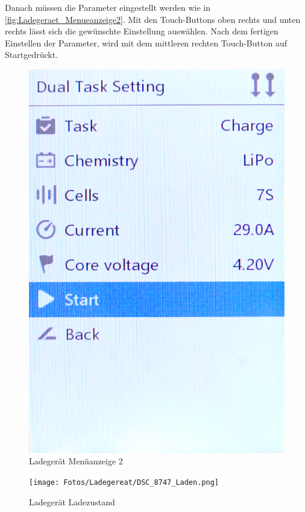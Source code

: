 Danach müssen die Parameter eingestellt werden wie in \autoref{fig:Ladegeraet_Menueanzeige2}. Mit den Touch-Buttons oben rechts und unten rechts lässt sich die gewünschte 
Einstellung auswählen. Nach dem fertigen Einstellen der Parameter, wird mit dem mittleren rechten Touch-Button auf \glqq Start\grqq gedrückt. 
\begin{figure}[H]
    \centering
    \includegraphics[width=.3\textwidth]{Fotos/Ladegereat/DSC_8745_Lademenue_2.png}
    \caption{Ladegerät Menüanzeige 2 \label{fig:Ladegeraet_Menueanzeige2}}
\end{figure}

\begin{figure}[H]
    \centering
    \texttt{[image: Fotos/Ladegereat/DSC\_8747\_Laden.png]}
    \caption{Ladegerät Ladezustand}
\end{figure}

